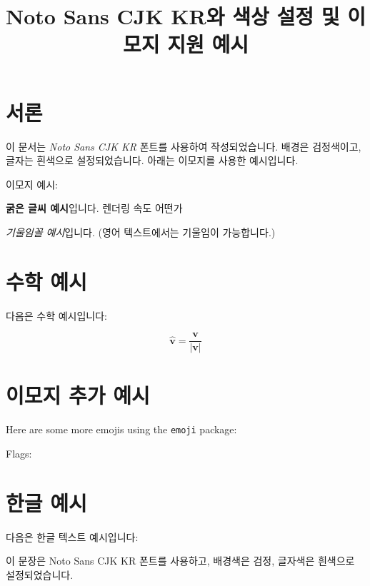 \documentclass[12pt]{article}
\title{Noto Sans CJK KR와 색상 설정 및 이모지 지원 예시}
\author{}
\date{}
\begin{document}
\maketitle

\section{서론}
이 문서는 \textit{Noto Sans CJK KR} 폰트를 사용하여 작성되었습니다. 배경은 검정색이고, 글자는 흰색으로 설정되었습니다. 아래는 이모지를 사용한 예시입니다.

이모지 예시:   

\textbf{굵은 글씨 예시}입니다. 렌더링 속도 어떤가

\textit{기울임꼴 예시}입니다. (영어 텍스트에서는 기울임이 가능합니다.)

\section{수학 예시}
다음은 수학 예시입니다:

\[
\hat{\mathbf{v}} = \frac{\mathbf{v}}{|\mathbf{v}|}
\]

\section{이모지 추가 예시}
Here are some more emojis using the \texttt{emoji} package:

 

Flags:

 

\section{한글 예시}
다음은 한글 텍스트 예시입니다:

이 문장은 Noto Sans CJK KR 폰트를 사용하고, 배경색은 검정, 글자색은 흰색으로 설정되었습니다.
\end{document}
